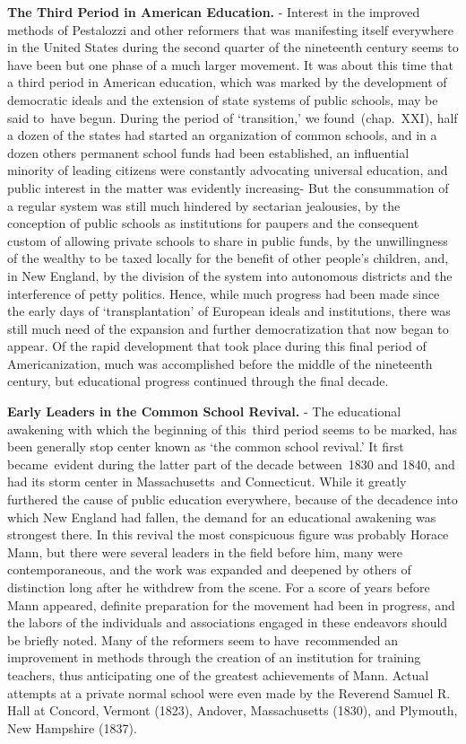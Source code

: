 \documentclass[
]{book}
\begin{document}
\textbf{The Third Period in American Education.} - Interest in the improved methods of Pestalozzi and other reformers that was manifesting itself everywhere in the United States during the second quarter of the nineteenth century seems to have been but one phase of a much larger movement. It was about this time that a third period in American education, which was marked by the development of democratic ideals and the extension of state systems of public schools, may be said to~have begun. During the period of `transition,' we found~(chap.~XXI), half a dozen of the states had started an organization of common schools, and in a dozen others permanent school funds had been established, an influential minority of leading citizens were constantly advocating universal education, and public interest in the matter was evidently increasing- But the consummation of a regular system was still much hindered by sectarian jealousies, by the conception of public schools as institutions for paupers and the consequent custom of allowing private schools to share in public funds, by the unwillingness of the wealthy to be taxed locally for the benefit of other people's children, and, in New England, by the division of the system into autonomous districts and the interference of petty politics. Hence, while much progress had been made since the early days of `transplantation' of European ideals and institutions, there was still much need of the expansion and further democratization that now began to appear. Of the rapid development that took place during this final period of Americanization, much was accomplished before the middle of the nineteenth century, but educational progress continued through the final decade.

\textbf{Early Leaders in the Common School Revival.} - The educational awakening with which the beginning of this~third period seems to be marked, has been generally stop center known as `the common school revival.' It first became~evident during the latter part of the decade between~1830 and 1840, and had its storm center in Massachusetts~and Connecticut. While it greatly furthered the cause of public education everywhere, because of the decadence into which New England had fallen, the demand for an educational awakening was strongest there. In this revival the most conspicuous figure was probably Horace Mann, but there were several leaders in the field before him, many were contemporaneous, and the work was expanded and deepened by others of distinction long after he withdrew from the scene. For a score of years before Mann appeared, definite preparation for the movement had been in progress, and the labors of the individuals and associations engaged in these endeavors should be briefly noted. Many of the reformers seem to have\emph{~}recommended an improvement in methods through the creation of an institution for training teachers, thus anticipating one of the greatest achievements of Mann. Actual attempts at a private normal school were even made by the Reverend Samuel R. Hall at Concord, Vermont (1823), Andover, Massachusetts (1830), and Plymouth, New Hampshire (1837).
\end{document}
